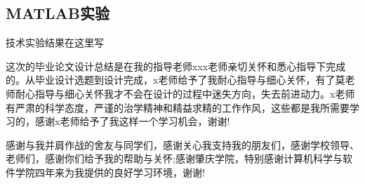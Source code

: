 \documentclass[bachelor, nocolorlinks, printoneside]{seuthesis} %
\begin{document}
\begin{Appendix}{}
    \chapter{MATLAB实验}
    技术实验结果在这里写
\end{Appendix}

\begin{Acknowledgement}{}
    这次的毕业论文设计总结是在我的指导老师xxx老师亲切关怀和悉心指导下完成的。从毕业设计选题到设计完成，x老师给予了我耐心指导与细心关怀，有了莫老师耐心指导与细心关怀我才不会在设计的过程中迷失方向，失去前进动力。x老师有严肃的科学态度，严谨的治学精神和精益求精的工作作风，这些都是我所需要学习的，感谢x老师给予了我这样一个学习机会，谢谢!

    感谢与我并肩作战的舍友与同学们，感谢关心我支持我的朋友们，感谢学校领导、老师们，感谢你们给予我的帮助与关怀;感谢肇庆学院，特别感谢计算机科学与软件学院四年来为我提供的良好学习环境，谢谢!
\end{Acknowledgement}

\newpage
\printindex %



%
%
\end{document}
